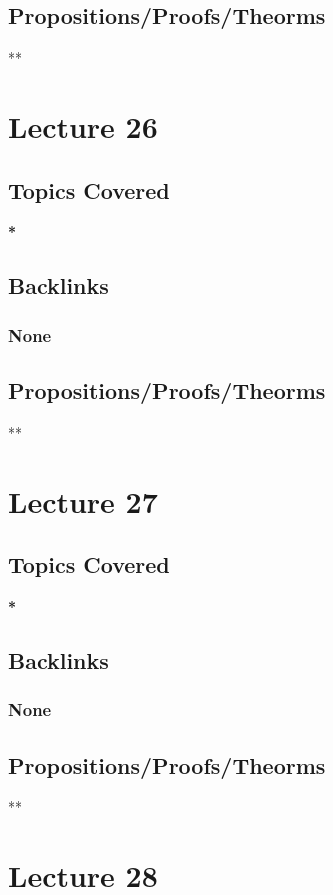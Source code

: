 \documentclass[11pt]{article}
\begin{document}
\subsection*{Propositions/Proofs/Theorms}
\label{sec:orgcfec975}
**

\section*{Lecture 26}
\label{sec:orge89d2d6}
\subsection*{Topics Covered}
\label{sec:org4315a08}
\textbf{*}
\subsection*{Backlinks}
\label{sec:org66ee7b4}
\subsubsection*{None}
\label{sec:orga912251}
\subsection*{Propositions/Proofs/Theorms}
\label{sec:orgd2635e4}
**

\section*{Lecture 27}
\label{sec:org7a99ccf}
\subsection*{Topics Covered}
\label{sec:org4c21847}
\textbf{*}
\subsection*{Backlinks}
\label{sec:orgdccf556}
\subsubsection*{None}
\label{sec:orgafdb613}
\subsection*{Propositions/Proofs/Theorms}
\label{sec:orgff4f499}
**

\section*{Lecture 28}
\label{sec:org23d9aba}
\end{document}
